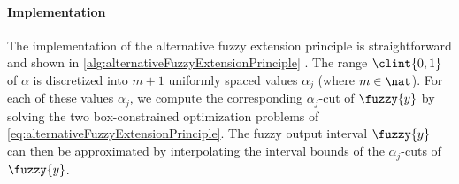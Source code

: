 \paragraph{Implementation}

The implementation of the alternative fuzzy extension principle
is straightforward and shown in \cref{alg:alternativeFuzzyExtensionPrinciple}
\cite{Klimke06Uncertainty}.
The range $\clint{0, 1}$ of $\alpha$
is discretized into $m + 1$ uniformly spaced values $\alpha_j$
(where $m \in \nat$).
For each of these values $\alpha_j$, we compute the corresponding
$\alpha_j$-cut of $\fuzzy{y}$ by solving the two box-constrained
optimization problems of \cref{eq:alternativeFuzzyExtensionPrinciple}.
The fuzzy output interval $\fuzzy{y}$ can then be approximated by
interpolating the interval bounds of the $\alpha_j$-cuts of $\fuzzy{y}$.

\begin{algorithm}
  \begin{algorithmic}[1]
      \EndFor{}\vspace{-2mm}
    \EndFunction{}
  \end{algorithmic}
  \caption[Alternative fuzzy extension principle]{%
    Alternative fuzzy extension principle.
    Inputs are the number of $\alpha$ segments to use as discretization and
    the $d$ fuzzy intervals $\fuzzy{x}_1, \dotsc, \fuzzy{x}_d$
    (we have to be able to determine $\alpha$-cuts
    of these fuzzy input intervals).
    The output is an approximation to the output $\fuzzy{y}$
    of the alternative fuzzy extension principle
    (given by an approximation of its membership function $\memfun{y}$).%
  }%
  \label{alg:alternativeFuzzyExtensionPrinciple}%
\end{algorithm}




